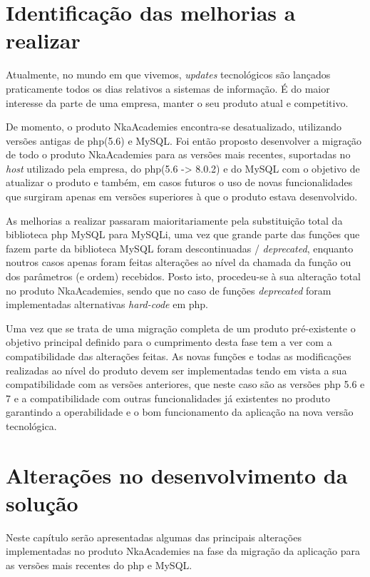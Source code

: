 \section{Identificação das melhorias a realizar}

Atualmente, no mundo em que vivemos, \textit{updates} tecnológicos são lançados praticamente todos os dias relativos a sistemas de informação. É do maior interesse da parte de uma empresa, manter o seu produto atual e competitivo.

De momento, o produto NkaAcademies encontra-se desatualizado, utilizando versões antigas de \acrshort{php}(5.6) e MySQL. Foi então proposto desenvolver a migração de todo o produto NkaAcademies para as versões mais recentes, suportadas no \textit{host} utilizado pela empresa, do \acrshort{php}(5.6 -> 8.0.2) e do MySQL com o objetivo de atualizar o produto e também, em casos futuros o uso de novas funcionalidades que surgiram apenas em versões superiores à que o produto estava desenvolvido.

As melhorias a realizar passaram maioritariamente pela substituição total da biblioteca \acrshort{php} MySQL para MySQLi, uma vez que grande parte das funções que fazem parte da biblioteca MySQL foram descontinuadas / \textit{deprecated}, enquanto noutros casos apenas foram feitas alterações ao nível da chamada da função ou dos parâmetros (e ordem) recebidos. Posto isto, procedeu-se à sua alteração total no produto NkaAcademies, sendo que no caso de funções \textit{deprecated} foram implementadas alternativas \textit{hard-code} em \acrshort{php}.

Uma vez que se trata de uma migração completa de um produto pré-existente o objetivo principal definido para o cumprimento desta fase tem a ver com a compatibilidade das alterações feitas. As novas funções e todas as modificações realizadas ao nível do produto devem ser implementadas tendo em vista a sua compatibilidade com as versões anteriores, que neste caso são as versões \acrshort{php} 5.6 e 7 e a compatibilidade com outras funcionalidades já existentes no produto garantindo a operabilidade e o bom funcionamento da aplicação na nova versão tecnológica.

\section{Alterações no desenvolvimento da solução}

Neste capítulo serão apresentadas algumas das principais alterações implementadas no produto NkaAcademies na fase da migração da aplicação para as versões mais recentes do \acrshort{php} e MySQL.

